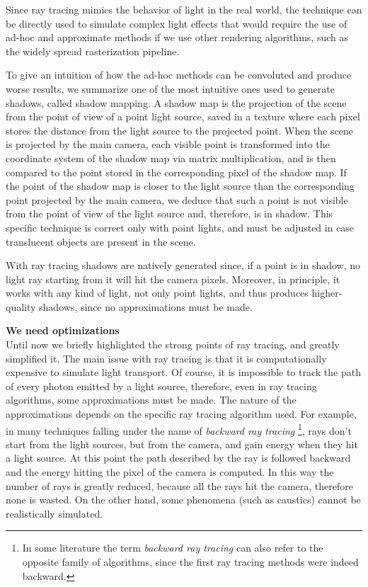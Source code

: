 \documentclass{PoliMi_MasterThesis}
\begin{document}
Since ray tracing mimics the behavior of light in the real world, the technique can be directly used to simulate complex light effects that would require the use of ad-hoc and approximate methods if we use other rendering algorithms, such as the widely spread rasterization pipeline.

To give an intuition of how the ad-hoc methods can be convoluted and produce worse results, we summarize one of the most intuitive ones used to generate shadows, called shadow mapping. A shadow map is the projection of the scene from the point of view of a point light source, saved in a texture where each pixel stores the distance from the light source to the projected point. When the scene is projected by the main camera, each visible point is transformed into the coordinate system of the shadow map via matrix multiplication, and is then compared to the point stored in the corresponding pixel of the shadow map. If the point of the shadow map is closer to the light source than the corresponding point projected by the main camera, we deduce that such a point is not visible from the point of view of the light source and, therefore, is in shadow. This specific technique is correct only with point lights, and must be adjusted in case translucent objects are present in the scene.

With ray tracing shadows are natively generated since, if a point is in shadow, no light ray starting from it will hit the camera pixels. Moreover, in principle, it works with any kind of light, not only point lights, and thus produces higher-quality shadows, since no approximations must be made.

\large \textbf{We need optimizations} \normalsize\\
Until now we briefly highlighted the strong points of ray tracing, and greatly simplified it. The main issue with ray tracing is that it is computationally expensive to simulate light transport. Of course, it is impossible to track the path of every photon emitted by a light source, therefore, even in ray tracing algorithms, some approximations must be made. The nature of the approximations depends on the specific ray tracing algorithm used. For example, in many techniques falling under the name of \textit{backward ray tracing} \footnote{In some literature the term \textit{backward ray tracing} can also refer to the opposite family of algorithms, since the first ray tracing methods were indeed backward.}, rays don't start from the light sources, but from the camera, and gain energy when they hit a light source. At this point the path described by the ray is followed backward and the energy hitting the pixel of the camera is computed. In this way the number of rays is greatly reduced, because all the rays hit the camera, therefore none is wasted. On the other hand, some phenomena (such as caustics) cannot be realistically simulated.
\end{document}
